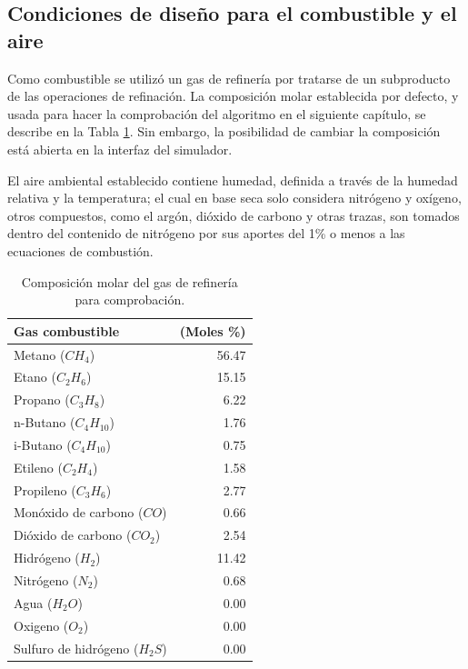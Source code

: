 \subsection{Condiciones de diseño para el combustible y el aire}
\par Como combustible se utilizó un gas de refinería por tratarse de un subproducto de las operaciones de refinación. La composición molar establecida por defecto, y usada para hacer la comprobación del algoritmo en el siguiente capítulo, se describe en la Tabla \ref{tbl:combustible}. Sin embargo, la posibilidad de cambiar la composición está abierta en la interfaz del simulador.
\par El aire ambiental establecido contiene humedad, definida a través de la humedad relativa y la temperatura; el cual en base seca solo considera nitrógeno y oxígeno, otros compuestos, como el argón, dióxido de carbono y otras trazas, son tomados dentro del contenido de nitrógeno por sus aportes del 1\% o menos a las ecuaciones de combustión.
\begin{table}[hbt]\begin{center}
\caption[Composición molar del gas de refinería]{Composición molar del gas de refinería para comprobación.}
\label{tbl:combustible}\begin{tabular}{l|r}
	Gas combustible					& (Moles \%) \\
	\hline
	Metano ($CH_4$)					& 56.47 \\
	Etano ($C_2H_6$)				& 15.15 \\
	Propano ($C_3H_8$)				& 6.22 \\
	n-Butano ($C_4H_{10}$)			& 1.76 \\
	i-Butano ($C_4H_{10}$)			& 0.75 \\
	Etileno ($C_2H_4$)				& 1.58 \\
	Propileno ($C_3H_6$)			& 2.77 \\
	Monóxido de carbono ($CO$)		& 0.66 \\
	Dióxido de carbono ($CO_2$)		& 2.54 \\
	Hidrógeno ($H_2$)				& 11.42 \\
	Nitrógeno ($N_2$)				& 0.68 \\
	Agua ($H_2O$)					& 0.00 \\
	Oxigeno ($O_2$)					& 0.00 \\
	Sulfuro de hidrógeno ($H_2S$)	& 0.00 \\
\end{tabular}\end{center}\end{table}
